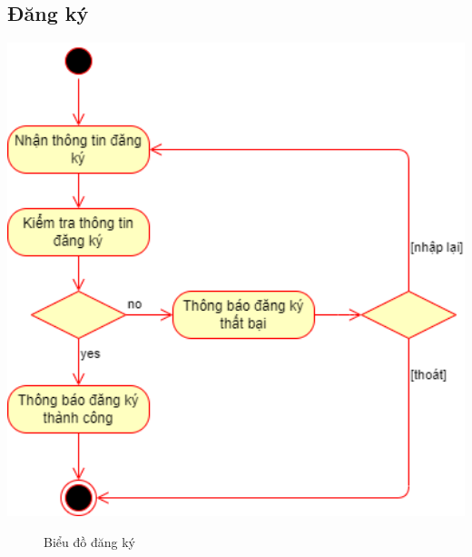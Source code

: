 \subsection{Đăng ký}
\begin{center}
	\includegraphics[width=1.1\textwidth]{../drawio/activity/logup.png}
	\begin{figure}[h]
		\centering
		\caption{Biểu đồ đăng ký}
	\end{figure}
\end{center}
